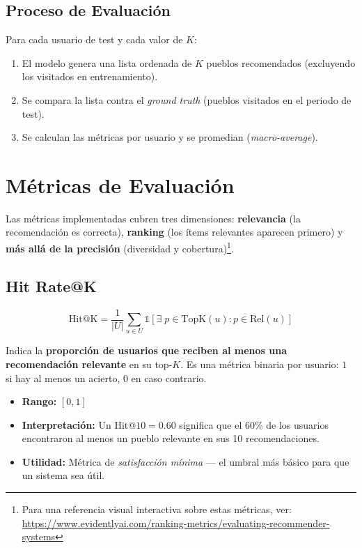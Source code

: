 \documentclass[11pt, a4paper]{article}
\begin{document}
\subsection{Proceso de Evaluación}

Para cada usuario de test y cada valor de $K$:

\begin{enumerate}
    \item El modelo genera una lista ordenada de $K$ pueblos recomendados (excluyendo los visitados en entrenamiento).
    \item Se compara la lista contra el \textit{ground truth} (pueblos visitados en el periodo de test).
    \item Se calculan las métricas por usuario y se promedian (\textit{macro-average}).
\end{enumerate}


\section{Métricas de Evaluación}

Las métricas implementadas cubren tres dimensiones: \textbf{relevancia} (la recomendación es correcta), \textbf{ranking} (los ítems relevantes aparecen primero) y \textbf{más allá de la precisión} (diversidad y cobertura)\footnote{Para una referencia visual interactiva sobre estas métricas, ver: \url{https://www.evidentlyai.com/ranking-metrics/evaluating-recommender-systems}}.

\subsection{Hit Rate@K}

\begin{equation}
    \text{Hit@K} = \frac{1}{|U|} \sum_{u \in U} \mathbb{1}\left[\exists \; p \in \text{TopK}(u) : p \in \text{Rel}(u)\right]
\end{equation}

Indica la \textbf{proporción de usuarios que reciben al menos una recomendación relevante} en su top-$K$. Es una métrica binaria por usuario: $1$ si hay al menos un acierto, $0$ en caso contrario.

\begin{itemize}
    \item \textbf{Rango:} $[0, 1]$
    \item \textbf{Interpretación:} Un $\text{Hit@10} = 0.60$ significa que el 60\% de los usuarios encontraron al menos un pueblo relevante en sus 10 recomendaciones.
    \item \textbf{Utilidad:} Métrica de \textit{satisfacción mínima} --- el umbral más básico para que un sistema sea útil.
\end{itemize}
\end{document}
